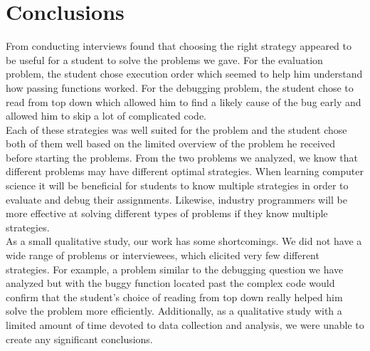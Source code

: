 \section{Conclusions}
From conducting interviews found that choosing the right strategy appeared to be useful for a student to solve the problems we gave. 
For the evaluation problem, the student chose execution order which seemed to help him understand how passing functions worked. 
For the debugging problem, the student chose to read from top down which allowed him to find a likely cause of the bug early and allowed him to skip a lot of complicated code.  \\

Each of these strategies was well suited for the problem and the student chose both of them well based on the limited overview of the problem he received before starting the problems. 
From the two problems we analyzed, we know that different problems may have different optimal strategies.
When learning computer science it will be beneficial for students to know multiple strategies in order to evaluate and debug their assignments. Likewise, industry programmers will be more effective at solving different types of problems if they know multiple strategies. \\

As a small qualitative study, our work has some shortcomings. We did not have a wide range of problems or interviewees, which elicited very few different strategies. For example, a problem similar to the debugging question we have analyzed but with the buggy function located past the complex code would confirm that the student's choice of reading from top down really helped him solve the problem more efficiently. Additionally, as a qualitative study with a limited amount of time devoted to data collection and analysis, we were unable to create any significant conclusions. 
